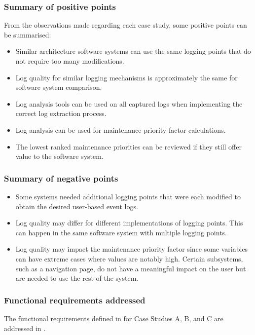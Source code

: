 \clearpage

\subsubsection{Summary of positive points}
From the observations made regarding each case study, some positive points can be summarised:

\begin{itemize}
	\item Similar architecture software systems can use the same logging points that do not require too many modifications.
	\item Log quality for similar logging mechanisms is approximately the same for software system comparison.
	\item Log analysis tools can be used on all captured logs when implementing the correct log extraction process.
	\item Log analysis can be used for maintenance priority factor calculations.
	\item The lowest ranked maintenance priorities can be reviewed if they still offer value to the software system.
\end{itemize}

\subsubsection{Summary of negative points}

\begin{itemize}
	\item Some systems needed additional logging points that were each modified to obtain the desired user-based event logs.
	\item Log quality may differ for different implementations of logging points. This can happen in the same software system with multiple logging points.
	\item Log quality may impact the maintenance priority factor since some variables can have extreme cases where values are notably high. Certain subsystems, such as a navigation page, do not have a meaningful impact on the user but are needed to use the rest of the system.
\end{itemize}

\clearpage

\subsubsection{Functional requirements addressed}
The functional requirements defined in  for Case Studies A, B, and C are addressed in .

